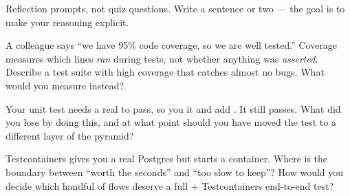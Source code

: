 
Reflection prompts, not quiz questions. Write a sentence or two --- the goal is to make your reasoning explicit.

\begin{thinkbox}
A colleague says ``we have 95\% code coverage, so we are well tested.'' Coverage measures which lines \emph{ran} during tests, not whether anything was \emph{asserted}. Describe a test suite with high coverage that catches almost no bugs. What would you measure instead?
\end{thinkbox}

\begin{thinkbox}
Your  unit test needs a real  to pass, so you  it and add . It still passes. What did you lose by doing this, and at what point should you have moved the test to a different layer of the pyramid?
\end{thinkbox}

\begin{thinkbox}
Testcontainers gives you a real Postgres but starts a container. Where is the boundary between ``worth the seconds'' and ``too slow to keep''? How would you decide which handful of flows deserve a full  + Testcontainers end-to-end test?
\end{thinkbox}


